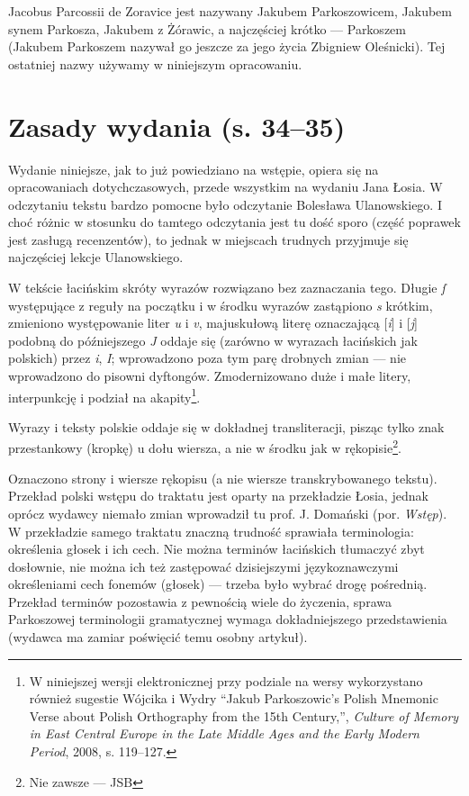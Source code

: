 \documentclass[dvipsnames,12pt]{report}
\begin{document}
Jacobus Parcossii de Zoravice jest nazywany Jakubem Parkoszowicem,
Jakubem synem Parkosza, Jakubem z Żórawic, a najczęściej krótko ---
Parkoszem (Jakubem Parkoszem nazywał go jeszcze za jego życia Zbigniew
Oleśnicki). Tej ostatniej nazwy używamy w niniejszym opracowaniu.

\section*{Zasady wydania (s. 34--35)}
\label{sec:zasady-wydania}


Wydanie niniejsze, jak to już powiedziano na wstępie, opiera się na
opracowaniach dotychczasowych, przede wszystkim na wydaniu Jana
Łosia. W odczytaniu tekstu bardzo pomocne było odczytanie Bolesława
Ulanowskiego. I choć różnic w stosunku do tamtego odczytania jest tu
dość sporo (część poprawek jest zasługą recenzentów), to jednak w
miejscach trudnych przyjmuje się najczęściej lekcje Ulanowskiego.


W tekście łacińskim skróty wyrazów rozwiązano bez zaznaczania
tego. Długie \textit{ſ} występujące z reguły na początku i w środku
wyrazów zastąpiono \textit{s} krótkim, zmieniono występowanie liter
\textit{u} i \textit{v}, majuskułową literę oznaczającą [\textit{i}] i
[\textit{j}] podobną do późniejszego \textit{J} oddaje się (zarówno w
wyrazach łacińskich jak polskich) przez \textit{i}, \textit{I};
wprowadzono poza tym parę drobnych zmian --- nie wprowadzono do
pisowni dyftongów. Zmodernizowano duże i małe litery, interpunkcję i
podział na akapity\footnote{W niniejszej wersji elektronicznej
przy podziale na wersy wykorzystano również sugestie Wójcika i Wydry ``{Jakub
    {Parkoszowic}'s {Polish} {Mnemonic} {Verse} about {Polish}
    {Orthography} from the 15th {Century}},'', \textit{Culture of
    Memory in East Central Europe in the Late Middle Ages and the
    Early Modern Period}, 2008, s. 119--127.}.

Wyrazy i teksty polskie oddaje się w dokładnej transliteracji, pisząc
tylko znak przestankowy (kropkę) u dołu wiersza, a nie w środku jak w
rękopisie\footnote{Nie zawsze --- JSB}.

Oznaczono strony i wiersze rękopisu (a nie wiersze transkrybowanego
tekstu).  Przekład polski wstępu do traktatu jest oparty na
przekładzie Łosia, jednak oprócz wydawcy niemało zmian wprowadził tu
prof. J. Domański (por. \textit{Wstęp}). W przekładzie samego traktatu
znaczną trudność sprawiała terminologia: określenia głosek i ich
cech. Nie można terminów łacińskich tłumaczyć zbyt dosłownie, nie
można ich też zastępować dzisiejszymi językoznawczymi określeniami
cech fonemów (głosek) — trzeba było wybrać drogę pośrednią. Przekład
terminów pozostawia z pewnością wiele do życzenia, sprawa Parkoszowej
terminologii gramatycznej wymaga dokładniejszego przedstawienia
(wydawca ma zamiar poświęcić temu osobny artykuł).
\end{document}
